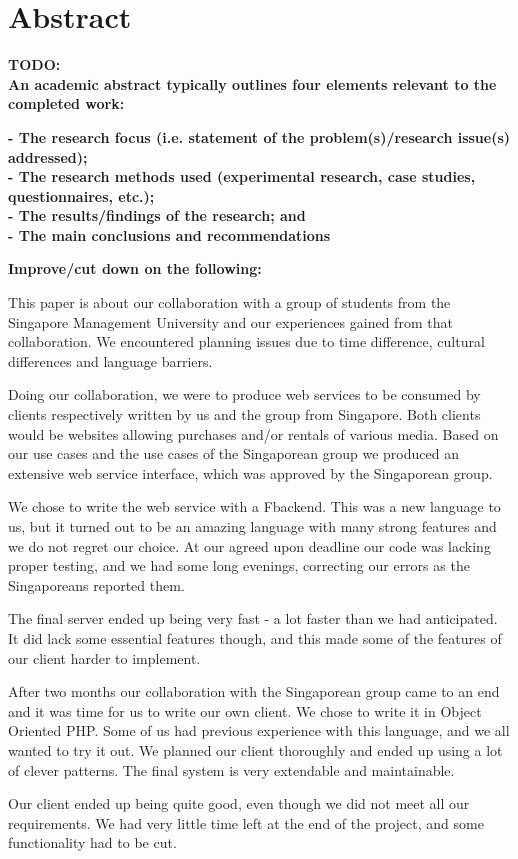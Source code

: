\section*{Abstract}

\textbf{TODO:}\\
\textbf{An academic abstract typically outlines four elements relevant to the completed work:}

    \textbf{- The research focus (i.e. statement of the problem(s)/research issue(s) addressed);}\\
    \textbf{- The research methods used (experimental research, case studies, questionnaires, etc.);}\\
    \textbf{- The results/findings of the research; and}\\
    \textbf{ - The main conclusions and recommendations}
    
\textbf{Improve/cut down on the following:}

This paper is about our collaboration with a group of students from the Singapore Management University and our experiences gained from that collaboration. We encountered planning issues due to time difference, cultural differences and language barriers.

Doing our collaboration, we were to produce web services to be consumed by clients respectively written by us and the group from Singapore. Both clients would be websites allowing purchases and/or rentals of various media.
Based on our use cases and the use cases of the Singaporean group we produced an extensive web service interface, which was approved by the Singaporean group.

We chose to write the web service with a F\Sh backend. This was a new language to us, but it turned out to be an amazing language with many strong features and we do not regret our choice.
At our agreed upon deadline our code was lacking proper testing, and we had some long evenings, correcting our errors as the Singaporeans reported them.

The final server ended up being very fast - a lot faster than we had anticipated. It did lack some essential features though, and this made some of the features of our client harder to implement.

After two months our collaboration with the Singaporean group came to an end and it was time for us to write our own client. We chose to write it in Object Oriented PHP. Some of us had previous experience with this language, and we all wanted to try it out. We planned our client thoroughly and ended up using a lot of clever patterns. The final system is very extendable and maintainable.

Our client ended up being quite good, even though we did not meet all our requirements. We had very little time left at the end of the project, and some functionality had to be cut.
\newpage